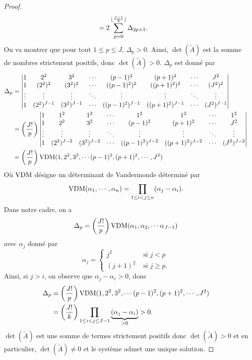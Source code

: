 \begin{proof}
\begin{align*}
& = 2 \displaystyle\sum\limits_{p=0}^{\lfloor \frac{J-1}{2} \rfloor} \Delta_{2p+1}.
\end{align*}
On va montrer que pour tout $1 \leq p \leq J$, $\Delta_p >0$. Ainsi, $\det(\tilde{A})$ est la somme de nombres strictement positifs, donc $\det(\tilde{A})>0$. $\Delta_p$ est donné par
\begin{align*}
\Delta_p & = \begin{vmatrix}
1 & 2^2 & 3^2 & \cdots & (p-1)^2 & (p+1)^2 & \cdots & J^2 \\ 
1 & (2^2)^2 & (3^2)^2 & \cdots & ((p-1)^2)^2 & ((p+1)^2)^{2} & \cdots & (J^2)^2 \\ 
\vdots & \vdots & \vdots & \ddots & \vdots & \vdots & \ddots & \vdots \\ 
1 & (2^2)^{J-1} & (3^2)^{J-1} & \cdots & ((p-1)^2)^{J-1} & ((p+1)^2)^{J-1} & \cdots & (J^2)^{J-1}
\end{vmatrix} \\
& = \left( \dfrac{J!}{p} \right) \begin{vmatrix}
1 & 1^2 & 1^2 & \cdots & 1^2 & 1^2 & \cdots & 1^2 \\ 
1 & 2^2 & 3^2 & \cdots & (p-1)^2 & (p+1)^{2} & \cdots & J^2 \\ 
\vdots & \vdots & \vdots & \ddots & \vdots & \vdots & \ddots & \vdots \\ 
1 & (2^2)^{J-2} & (3^2)^{J-2} & \cdots & ((p-1)^2)^{J-2} & ((p+1)^2)^{J-2} & \cdots & (J^2)^{J-2}
\end{vmatrix} \\
& = \left( \dfrac{J!}{p} \right) \text{VDM}(1, 2^2, 3^2, \cdots (p-1)^2, (p+1)^2, \cdots, J^2)
\end{align*}
Où $\text{VDM}$ désigne un déterminant de Vandermonde \cite{Evans1976} déterminé par 
\begin{equation}
\text{VDM}(\alpha_1, \cdots, \alpha_n) = \displaystyle\prod\limits_{1\leq i < j \leq n} (\alpha_j - \alpha_i).
\end{equation}
Dans notre cadre, on a
\begin{equation}
\Delta_p = \left( \dfrac{J!}{p} \right) \text{VDM}(\alpha_1, \alpha_2, \cdots \alpha_{J-1})
\end{equation}
avec $\alpha_j$ donné par
\begin{equation}
\alpha_j = \left\lbrace
\begin{array}{cl}
j^2 & \text{ si } j<p \\
(j+1)^2 & \text{ si } j \geq p.
\end{array}
\right.
\end{equation}
Ainsi, si $j>i$, on observe que $\alpha_j - \alpha_i>0$, donc
\begin{align*}
\Delta_p & = \left( \dfrac{J!}{p} \right) \text{VDM}(1, 2^2, 3^2, \cdots (p-1)^2, (p+1)^2, \cdots, J^2) \\
	& = \left( \dfrac{J!}{k} \right)  \displaystyle\prod\limits_{1\leq i < j \leq J-1} \underbrace{(\alpha_j - \alpha_i)}_{>0} >0.
\end{align*}
$\det(\tilde{A})$ est une somme de termes strictement positifs donc $\det(\tilde{A})>0$ et en particulier, $\det(\tilde{A}) \neq 0$ et le système admet une unique solution.
\end{proof}

